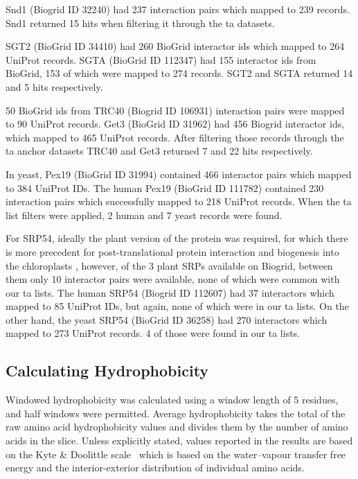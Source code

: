 Snd1 (Biogrid ID 32240) had 237 interaction pairs which mapped to 239 records.
Snd1 returned 15 hits when filtering it through the \gls{ta} datasets.

SGT2 (BioGrid ID 34410) had 260 BioGrid interactor ids which mapped to 264 UniProt records.
SGTA (BioGrid ID 112347) had 155 interactor ids from BioGrid, 153 of which were mapped to 274 records.
SGT2 and SGTA returned 14 and 5 hits respectively.

50 BioGrid ids from TRC40 (Biogrid ID 106931) interaction pairs were mapped to 90 UniProt records.
Get3 (BioGrid ID 31962) had 456 Biogrid interactor ids, which mapped to 465 UniProt records.
After filtering those records through the \gls{ta} anchor datasets TRC40 and Get3 returned 7 and 22 hits respectively.

In yeast, Pex19 (BioGrid ID 31994) contained 466 interactor pairs which mapped to 384 UniProt IDs.
The human Pex19 (BioGrid ID 111782) contained 230 interaction pairs which successfully mapped to 218 UniProt records.
When the \gls{ta} list filters were applied, 2 human and 7 yeast records were found.

For SRP54, ideally the plant version of the protein was required, for which there is more precedent for post-translational protein interaction and biogenesis into the chloroplasts \cite{Abell2004}, however, of the 3 plant SRPs available on Biogrid, between them only 10 interactor pairs were available, none of which were common with our \gls{ta} lists.
The human SRP54 (Biogrid ID 112607) had 37 interactors which mapped to 85 UniProt IDs, but again, none of which were in our \gls{ta} lists.
On the other hand, the yeast SRP54 (BioGrid ID 36258) had 270 interactors which mapped to 273 UniProt records.
4 of those were found in our \gls{ta} lists.

\subsection{Calculating Hydrophobicity}
Windowed hydrophobicity was calculated using a window length of 5 residues, and half windows were permitted.
Average hydrophobicity takes the total of the raw amino acid hydrophobicity values and divides them by the number of amino acids in the slice.
Unless explicitly stated, values reported in the results are based on the Kyte \& Doolittle scale~\cite{Kyte1982} which is based on the water\---vapour transfer free energy and the interior-exterior distribution of individual amino acids.


